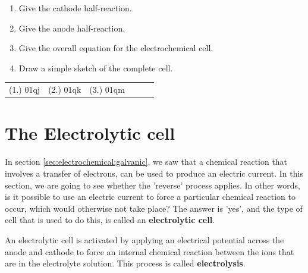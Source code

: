 {\begin{enumerate}
\begin{enumerate}
	\item{Give the cathode half-reaction.}
	\item{Give the anode half-reaction.}
	\item{Give the overall equation for the electrochemical cell.}
	\item{Draw a simple sketch of the complete cell.}
	\end{enumerate}

\end{enumerate}

\par \practiceinfo
\par \begin{tabular}[h]{cccccc}
(1.)	01qj	&
(2.)	01qk	&
(3.)	01qm	&
\end{tabular}
}







\section{The Electrolytic cell}
\label{sec:electrochemical:electrolytic}

In section \ref{sec:electrochemical:galvanic}, we saw that a chemical reaction that involves a transfer of electrons, can be used to produce an electric current. In this section, we are going to see whether the 'reverse' process applies. In other words, is it possible to use an electric current to force a particular chemical reaction to occur, which would otherwise not take place? The answer is 'yes', and the type of cell that is used to do this, is called an \textbf{electrolytic cell}.


An electrolytic cell is activated by applying an electrical potential across the anode and cathode to force an internal chemical reaction between the ions that are in the electrolyte solution. This process is called \textbf{electrolysis}.


